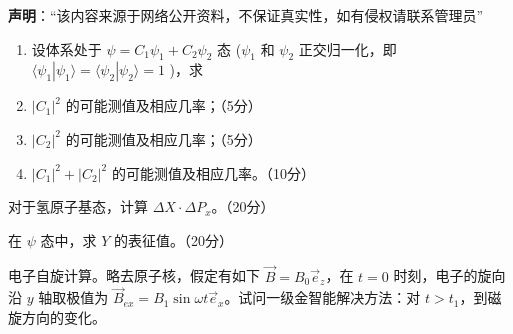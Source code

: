 
\textbf{声明}：“该内容来源于网络公开资料，不保证真实性，如有侵权请联系管理员”

\begin{enumerate}
    \item 设体系处于 $\psi = C_1 \psi_1 + C_2 \psi_2$ 态 ($\psi_1$ 和 $\psi_2$ 正交归一化，即 $\langle \psi_1 | \psi_1 \rangle = \langle \psi_2 | \psi_2 \rangle = 1$ )，求
    
        \item $|C_1|^2$ 的可能测值及相应几率；（5分）
        \item $|C_2|^2$ 的可能测值及相应几率；（5分）
        \item $|C_1|^2 + |C_2|^2$ 的可能测值及相应几率。（10分）
    \end{enumerate}

    
    对于氢原子基态，计算 $\Delta X \cdot \Delta P_x$。（20分）
    \item 在 $\psi$ 态中，求 $Y$ 的表征值。（20分）
    \item 电子自旋计算。略去原子核，假定有如下 $\vec{B} = B_0 \vec{e}_z$，在 $t=0$ 时刻，电子的旋向沿 $y$ 轴取极值为 $\vec{B}_{ex} = B_1 \sin \omega t \vec{e}_x$。试问一级金智能解决方法：对 $t>t_1$，到磁旋方向的变化。
